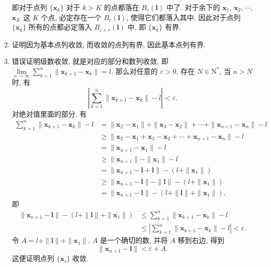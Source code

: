 \begin{enumerate}
\[        \]
        即对于点列 $\{\boldsymbol{x}_k\}$ 对于 $k > K$ 的点都落在 $B_\varepsilon(\boldsymbol{l})$ 中了.
        对于余下的 $\boldsymbol{x}_1$, $\boldsymbol{x}_2$, $\cdots$, $\boldsymbol{x}_K$ 这 $K$ 个点, 必定存在一个 $B_r(\boldsymbol{l})$, 使得它们都落入其中.
        因此对于点列 $\{\boldsymbol{x}_k\}$ 所有的点都必定落入 $B_{\varepsilon + r}(\boldsymbol{l})$ 中, 即 $\{\boldsymbol{x}_k\}$ 有界.
    \item %
        {\heiti 证明}\quad 因为基本点列收敛, 而收敛的点列有界, 因此基本点列有界.
    \item %
        {\heiti 错误}{\heiti 证明}\quad 级数收敛, 就是对应的部分和数列收敛, 即 $\lim\limits_{n\to\infty} \sum\limits_{k=1}^n \| \boldsymbol{x}_{k+1} - \boldsymbol{x}_k \| = l$.
        那么对任意的 $\varepsilon > 0$, 存在 $N \in \mathrm{N}^*$, 当 $n>N$ 时, 有
        \[
            \left| \sum_{k=1}^n\| \boldsymbol{x}_{k+1} - \boldsymbol{x}_k \| - l \right| < \varepsilon.   
        \]
        对绝对值里面的部分, 有
        \begin{align*}
            \sum_{k=1}^n\| \boldsymbol{x}_{k+1} - \boldsymbol{x}_k \| - l &= \| \boldsymbol{x}_2 - \boldsymbol{x}_1 \| + \| \boldsymbol{x}_3 - \boldsymbol{x}_2 \| + \cdots + \| \boldsymbol{x}_{n+1} - \boldsymbol{x}_n \| - l \\
            &\geqslant \| \boldsymbol{x}_2 - \boldsymbol{x}_1 + \boldsymbol{x}_3 - \boldsymbol{x}_2 + \cdots + \boldsymbol{x}_{n+1} - \boldsymbol{x}_n \| - l \\
            &= \| \boldsymbol{x}_{n+1} - \boldsymbol{x}_1 \| - l \\
            &\geqslant \| \boldsymbol{x}_{n+1} \| - \| \boldsymbol{x}_1 \| - l \\
            &= \| \boldsymbol{x}_{n+1} - \boldsymbol{l} + \boldsymbol{l} \| - (l + \|\boldsymbol{x}_1\|) \\
            &\geqslant \| \boldsymbol{x}_{n+1} - \boldsymbol{l} \| - \| \boldsymbol{l} \| - (l + \|\boldsymbol{x}_1\|) \\
            &= \| \boldsymbol{x}_{n+1} - \boldsymbol{l} \| - (l + \|\boldsymbol{l}\| + \|\boldsymbol{x}_1\|).
        \end{align*}
        即
        \begin{align*}
            \| \boldsymbol{x}_{n+1} - \boldsymbol{l} \| - (l + \|\boldsymbol{l}\| + \|\boldsymbol{x}_1\|) &\leqslant \sum_{k=1}^n\| \boldsymbol{x}_{k+1} - \boldsymbol{x}_k \| - l \\
            &\leqslant \left|\sum_{k=1}^n\| \boldsymbol{x}_{k+1} - \boldsymbol{x}_k \| - l\right| < \varepsilon.
        \end{align*}
        令 $A = l + \|\boldsymbol{l}\| + \|\boldsymbol{x}_1\|$, $A$ 是一个确切的数, 并将 $A$ 移到右边, 得到
        \[
            \| \boldsymbol{x}_{n+1} - \boldsymbol{l} \| < \varepsilon + A.     
        \]
        这便证明点列 $\{\boldsymbol{x}_i\}$ 收敛.
\end{enumerate}
% 